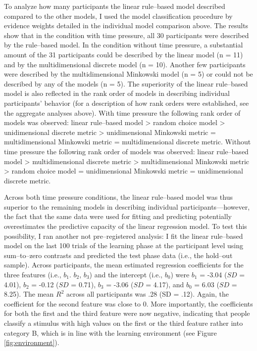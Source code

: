 \documentclass[a4paper,man,natbib]{apa6}
\begin{document}
To analyze how many participants the linear rule--based model described compared to the other models, I used the model classification procedure by evidence weights detailed in the individual model comparison above. The results show that in the condition with time pressure, all 30 participants were described by the rule--based model. In the condition without time pressure, a substantial amount of the 31 participants could be described by the linear model (n = 11) and by the multidimensional discrete model (n = 10). Another few participants were described by the multidimensional Minkowski model (n = 5) or could not be described by any of the models (n = 5). 
The superiority of the linear rule--based model is also reflected in the rank order of models in describing individual participants' behavior (for a description of how rank orders were established, see the aggregate analyses above). With time pressure the following rank order of models was observed: linear rule--based model > random choice model > unidimensional discrete metric > unidimensional Minkowski metric = multidimensional Minkowski metric = multidimensional discrete metric. Without time pressure the following rank order of models was observed: linear rule--based model > multidimensional discrete metric > multidimensional Minkowski metric > random choice model = unidimensional Minkowski metric = unidimensional discrete metric.

Across both time pressure conditions, the linear rule--based model was thus superior to the remaining models in describing individual participants---however, the fact that the same data were used for fitting and predicting potentially overestimates the predictive capacity of the linear regression model. To test this possibility, I ran another not pre--registered analysis: I fit the linear rule--based model on the last 100 trials of the learning phase at the participant level using sum--to--zero contrasts and predicted the test phase data (i.e., the hold--out sample). Across participants, the mean estimated regression coefficients for the three features (i.e., $b_1$. $b_2$, $b_3$) and the intercept (i.e., $b_0$) were $b_1$ = -3.04 ($SD$ = 4.01), $b_2$ = -0.12 ($SD$ = 0.71), $b_3$ = -3.06 ($SD$ = 4.17), and $b_0$ = 6.03 ($SD$ = 8.25). The mean $R^2$ across all participants was .28 (SD = .12). 
Again, the coefficient for the second feature was close to 0. More importantly, the coefficients for both the first and the third feature were now negative, indicating that people classify a stimulus with high values on the first or the third feature rather into category B, which is in line with the learning environment (see Figure \ref{fig:environment}).
\end{document}
